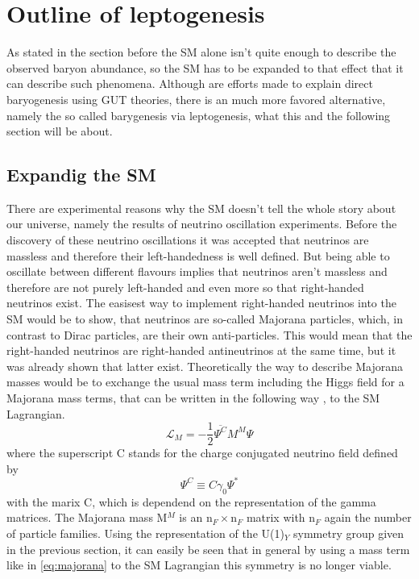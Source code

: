 \section{Outline of leptogenesis}
As stated in the section before the SM alone isn't quite enough to describe the observed baryon abundance, so the SM has to be expanded to that effect that it can describe such phenomena. \newline
Although are efforts made to explain direct baryogenesis using GUT theories, there is an much more favored alternative, namely the so called barygenesis via leptogenesis, what this and the following section will be about. 
\subsection{Expandig the SM}
There are experimental reasons why the SM doesn't tell the whole story about our universe, namely the results of neutrino oscillation experiments. Before the discovery of these neutrino oscillations it was accepted that neutrinos are massless and therefore their left-handedness is well defined. But being able to oscillate between different flavours implies that neutrinos aren't massless and therefore are not purely left-handed and even more so that right-handed neutrinos exist. The easisest way to implement right-handed neutrinos into the SM would be to show, that neutrinos are so-called Majorana particles, which, in contrast to Dirac particles, are their own anti-particles. This would mean that the right-handed neutrinos are right-handed antineutrinos at the same time, but it was already shown that latter exist. Theoretically the way to describe Majorana masses would be to exchange the usual mass term including the Higgs field for a Majorana mass terms, that can be written in the following way \cite[pp. 18]{Taanila:2008}, to the SM Lagrangian.
\begin{equation*}
	\mathcal{L}_M=-\frac{1}{2}\overline{\Psi^C}M^M\Psi
	\label{eq:majorana}
\end{equation*}
where the superscript C stands for the charge conjugated neutrino field defined by
\begin{equation*}
	\Psi^C\equiv C\gamma_0\Psi^*
\end{equation*}
with the marix C, which is dependend on the representation of the gamma matrices. The Majorana mass M$^M$ is an n$_F\times$n$_F$ matrix with n$_F$ again the number of particle families. \newline
Using the representation of the U(1)$_Y$ symmetry group given in the previous section, it can easily be seen that in general by using a mass term like in \ref{eq:majorana} to the SM Lagrangian this symmetry is no longer viable.
